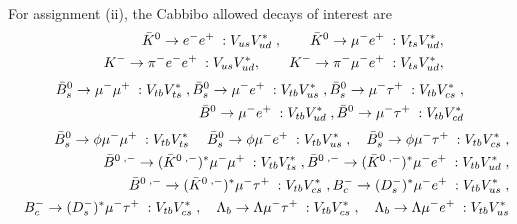 \documentclass{ws-ijmpa}
\begin{document}
For assignment (ii), the Cabbibo allowed decays of interest are
\begin{eqnarray}
\bar{K}^{0} \to e^{-}e^{+}\; : V_{us}V^{*}_{ud}\; , \quad\quad \bar{K}^{0} \to \mu^{-}e^{+}\; : V_{ts}V^{*}_{ud} ,
\notag\\
\quad\quad K^{-} \to \pi^{-}e^{-}e^{+}\; : V_{us}V^{*}_{ud} ,\quad \quad K^{-} \to \pi^{-}\mu^{-}e^{+}\; : V_{ts}V^{*}_{ud} \label{Kd2-1},
\end{eqnarray}
\begin{eqnarray}
\bar{B}_{s}^{0} \to \mu^{-}\mu^{+}\; : V_{tb}V^{*}_{ts}\; , \bar{B}_{s}^{0} \to \mu^{-}e^{+}\; : V_{tb}V^{*}_{us}\; ,  \bar{B}_{s}^{0} \to \mu^{-}\tau^{+}\; : V_{tb}V^{*}_{cs}\; ,\notag\\
 \bar{B}^{0} \to \mu^{-}e^{+}\; : V_{tb}V^{*}_{ud}\; , \bar{B}^{0} \to \mu^{-}\tau^{+}\; : V_{tb}V^{*}_{cd} \label{Bd2-1}
\end{eqnarray}
\begin{eqnarray}
\bar{B}_{s}^{0} \to \phi \mu^{-}\mu^{+}\; : V_{tb}V^{*}_{ts}\; \quad \bar{B}_{s}^{0} \to \phi \mu^{-}e^{+}\; : V_{tb}V^{*}_{us}\;, \quad \bar{B}_{s}^{0} \to \phi \mu^{-}\tau^{+}\; : V_{tb}V^{*}_{cs}\; ,\notag\\
\bar{B}^{0\;, -} \to (\bar{K}^{0\;, -})^{*}\mu^{-}\mu^{+}\; : V_{tb}V^{*}_{ts}\; ,
\bar{B}^{0\;, -} \to (\bar{K}^{0\;, -})^{*}\mu^{-}e^{+}\; : V_{tb}V^{*}_{ud}\; ,\notag \\
\quad \bar{B}^{0\;, -} \to (\bar{K}^{0\;, -})^{*}\mu^{-}\tau^{+}\; : V_{tb}V^{*}_{cs}\;, 
 B_{c}^{ -} \to (D_{s}^{-})^{*}\mu^{-}e^{+}\; : V_{tb}V^{*}_{us}\; ,\notag \\\quad B_{c}^{-} \to (D_{s}^{-})^{*}\mu^{-}\tau^{+}\; : V_{tb}V^{*}_{cs}\;, 
 \quad \Lambda_{b} \to \Lambda \mu^{-}\tau^{+}\; :  V_{tb}V^{*}_{cs} \;,  \quad\Lambda_{b} \to \Lambda \mu^{-}e^{+}\; :  V_{tb}V^{*}_{us} \notag\\
 \label{Bcs-1}
\end{eqnarray}
\end{document}
